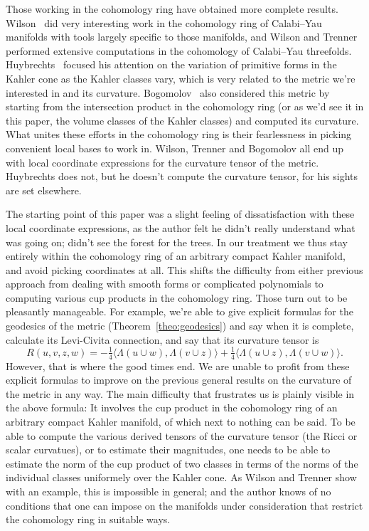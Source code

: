 \documentclass[11pt,a4paper]{amsart}
\theoremstyle{definition}
\theoremstyle{remark}
\def\onfo{\tfrac14}
\def\Lef{\Lambda}
\def\ton{u}
\def\ttw{v}
\def\tth{z}
\def\tfo{w}
\begin{document}
Those working in the cohomology ring have obtained more complete results. Wilson~\cite{Wilson} did very interesting work in the cohomology ring of Calabi--Yau manifolds with tools largely specific to those manifolds, and Wilson and Trenner~\cite{WilsonTrenner} performed extensive computations in the cohomology of Calabi--Yau threefolds. Huybrechts~\cite{Huybrechts} focused his attention on the variation of primitive forms in the Kahler cone as the Kahler classes vary, which is very related to the metric we're interested in and its curvature. Bogomolov~\cite{Bogomolov} also considered this metric by starting from the intersection product in the cohomology ring (or as we'd see it in this paper, the volume classes of the Kahler classes) and computed its curvature. What unites these efforts in the cohomology ring is their fearlessness in picking convenient local bases to work in. Wilson, Trenner and Bogomolov all end up with local coordinate expressions for the curvature tensor of the metric. Huybrechts does not, but he doesn't compute the curvature tensor, for his sights are set elsewhere.

The starting point of this paper was a slight feeling of dissatisfaction with these local coordinate expressions, as the author felt he didn't really understand what was going on; didn't see the forest for the trees. In our treatment we thus stay entirely within the cohomology ring of an arbitrary compact Kahler manifold, and avoid picking coordinates at all. This shifts the difficulty from either previous approach from dealing with smooth forms or complicated polynomials to computing various cup products in the cohomology ring. Those turn out to be pleasantly manageable. For example,
we're able to give explicit formulas for the geodesics of the metric
(Theorem~\ref{theo:geodesics}) and say when it is complete, calculate
its Levi-Civita connection, and say that its curvature tensor is
$$
R(\ton,\ttw,\tth,\tfo)
=
- \onfo \langle \Lef(\ton \cup \tfo), \Lef(\ttw \cup \tth) \rangle
+ \onfo \langle \Lef(\ton \cup \tth), \Lef(\ttw \cup \tfo) \rangle.
$$
However, that is where the good times end. We are unable to profit from these explicit formulas to improve on the previous general results on the curvature of the metric in any way. The main difficulty that frustrates us is plainly visible in the above formula: It involves the cup product in the cohomology ring of an arbitrary compact Kahler manifold, of which next to nothing can be said. To be able to compute the various derived tensors of the curvature tensor (the Ricci or scalar curvatues), or to estimate their magnitudes, one needs to be able to estimate the norm of the cup product of two classes in terms of the norms of the individual classes uniformely over the Kahler cone. As Wilson and Trenner show with an example, this is impossible in general; and the author knows of no conditions that one can impose on the manifolds under consideration that restrict the cohomology ring in suitable ways.
\end{document}
